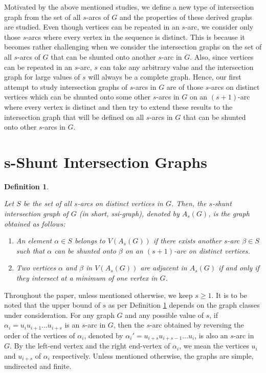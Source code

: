 \documentclass[12pt,a4paper,twoside]{article}
\newtheorem{definition}[theorem]{Definition}
\theoremstyle{casesty}
\theoremstyle{subcasesty}
\theoremstyle{schemesty}
\begin{document}
Motivated by the above mentioned studies, we define a new type of intersection graph from the set of all $s$-arcs of $G$ and the properties of these derived graphs are studied. Even though vertices can be repeated in an $s$-arc, we consider only those $s$-arcs where every vertex in the sequence is distinct. This is because it becomes rather challenging when we consider the intersection graphs on the set of all $s$-arcs of $G$ that can be shunted onto another $s$-arc in $G$. Also, since vertices can be repeated in an $s$-arc, $s$ can take any arbitrary value and the intersection graph for large values of $s$ will always be a complete graph. Hence, our first attempt to study intersection graphs of $s$-arcs in $G$ are of those $s$-arcs on distinct vertices which can be shunted onto some other $s$-arcs in $G$ on an $(s+1)$-arc where every vertex is distinct and then try to extend these results to the intersection graph that will be defined on all $s$-arcs in $G$ that can be shunted onto other $s$-arcs in $G$. 

\section{s-Shunt Intersection Graphs}

\begin{definition} \label{Defn1}{\rm
	Let $S$ be the set of all $s$-arcs on distinct vertices in $G$. Then, the \textit{$s$-shunt intersection graph} of $G$ (in short, ssi-graph), denoted by $A_{s}(G)$, is the graph obtained as follows:
	\begin{enumerate}[label=(\roman*),left=0.5cm]
		\item An element $\alpha \in S$ belongs to $V(A_{s}(G))$ if there exists another $s$-arc $\beta \in S$ such that $\alpha$ can be shunted onto $\beta$ on an $(s+1)$-arc on distinct vertices.
		\item Two vertices $\alpha$ and $\beta$ in $V(A_{s}(G))$ are adjacent in $A_{s}(G)$ if and only if they intersect at a minimum of one vertex in $G$.
	\end{enumerate} 
}\end{definition}

Throughout the paper, unless mentioned otherwise, we keep $s \geq 1$. It is to be noted that the upper bound of $s$ as per Definition \ref{Defn1} depends on the graph classes under consideration. For any graph $G$ and any possible value of $s$, if $\alpha_{i} = u_{i}u_{i+1}\ldots u_{i+s}$ is an $s$-arc in $G$, then the $s$-arc obtained by reversing the order of the vertices of $\alpha_{i}$, denoted by $\alpha_{i}' = u_{i+s}u_{i+s-1}\ldots u_{i}$, is also an $s$-arc in $G$. By the left-end vertex and the right end-vertex of $\alpha_{i}$, we mean the vertices $u_{i}$ and $u_{i+s}$ of $\alpha_{i}$ respectively. Unless mentioned otherwise, the graphs are simple, undirected and finite. 
\end{document}
